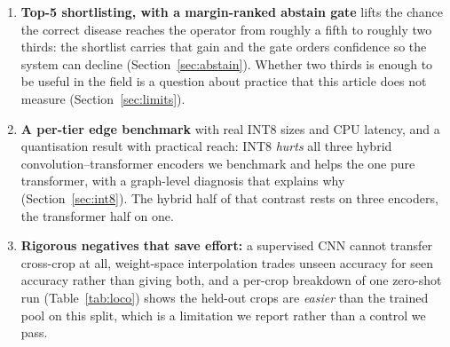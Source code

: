 \documentclass[a4paper,fleqn]{cas-dc}
\begin{document}
\begin{enumerate}
single generic symptom sentence does not: it loses to the bare name at 34 and 51 classes. A
de-duplicated re-run at all three scales (Section~\ref{sec:dedup}) shows the keyword bank's decay
is robust to label cleaning and to every averaging convention we tried, while an apparent rise of
source-grounded text is not; what survives is that source-grounded text does not decay where the
bank does. We further show that the usual comparison against a keyword-retrieved symptom bank is
confounded by prototype collisions rather than by grounding, and separate the two with an
ungrounded-generation control (Section~\ref{sec:desc}). The four strategies are our own; we do not
implement DCLIP or CuPL, so this is not a comparison against the established descriptor-generation
methods (Section~\ref{sec:limits}).
\item \textbf{Top-5 shortlisting, with a margin-ranked abstain gate} lifts the chance the correct disease reaches the operator from roughly a fifth to roughly two thirds: the shortlist carries that gain and the gate orders confidence so the system can decline (Section~\ref{sec:abstain}). Whether two thirds is enough to be useful in the field is a question about practice that this article does not measure (Section~\ref{sec:limits}).
\item \textbf{A per-tier edge benchmark} with real INT8 sizes and CPU latency, and a quantisation
result with practical reach: INT8 \emph{hurts} all three hybrid convolution--transformer encoders
we benchmark and helps the one pure transformer, with a graph-level diagnosis that explains why
(Section~\ref{sec:int8}). The hybrid half of that contrast rests on three encoders, the
transformer half on one.
\item \textbf{Rigorous negatives that save effort:} a supervised CNN cannot transfer cross-crop at
all, weight-space interpolation trades unseen accuracy for seen accuracy rather than giving both,
and a per-crop breakdown of one zero-shot run (Table~\ref{tab:loco}) shows the held-out crops are
\emph{easier} than the trained pool on this split, which is a limitation we report rather than a
control we pass.
\end{enumerate}
\end{document}

